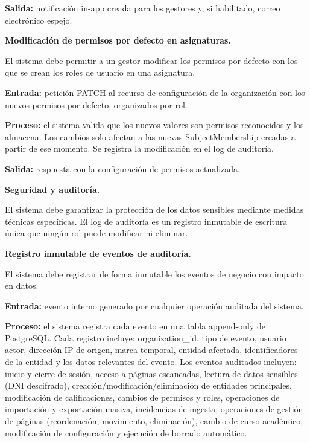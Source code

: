 \begin{functional}
\begin{functional}
    \textbf{Salida:} notificación in-app creada para los gestores y, si habilitado, correo electrónico espejo.

    \item \textbf{Modificación de permisos por defecto en asignaturas.}

    El sistema debe permitir a un gestor modificar los permisos por defecto con los que se crean los roles de usuario en una asignatura.

    \textbf{Entrada:} petición PATCH al recurso de configuración de la organización con los nuevos permisos por defecto, organizados por rol.

    \textbf{Proceso:} el sistema valida que los nuevos valores son permisos reconocidos y los almacena. Los cambios solo afectan a las nuevas SubjectMembership creadas a partir de ese momento. Se registra la modificación en el log de auditoría.

    \textbf{Salida:} respuesta con la configuración de permisos actualizada.

  \end{functional}

  \item \textbf{Seguridad y auditoría.}

  El sistema debe garantizar la protección de los datos sensibles mediante medidas técnicas específicas. El log de auditoría es un registro inmutable de escritura única que ningún rol puede modificar ni eliminar.

  \begin{functional}
    \item \textbf{Registro inmutable de eventos de auditoría.}

    El sistema debe registrar de forma inmutable los eventos de negocio con impacto en datos.

    \textbf{Entrada:} evento interno generado por cualquier operación auditada del sistema.

    \textbf{Proceso:} el sistema registra cada evento en una tabla append-only de PostgreSQL. Cada registro incluye: organization\_id, tipo de evento, usuario actor, dirección IP de origen, marca temporal, entidad afectada, identificadores de la entidad y los datos relevantes del evento. Los eventos auditados incluyen: inicio y cierre de sesión, acceso a páginas escaneadas, lectura de datos sensibles (DNI descifrado), creación/modificación/eliminación de entidades principales, modificación de calificaciones, cambios de permisos y roles, operaciones de importación y exportación masiva, incidencias de ingesta, operaciones de gestión de páginas (reordenación, movimiento, eliminación), cambio de curso académico, modificación de configuración y ejecución de borrado automático.


\end{functional}
\end{functional}
